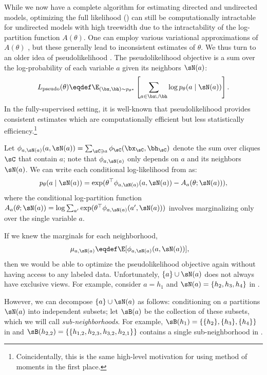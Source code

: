 While we now have a complete algorithm for estimating directed and undirected
models, optimizing the full likelihood ()
can still be computationally intractable for undirected models with high treewidth
due to the intractability of the log-partition function $A(\theta)$.
One can employ various variational approximations of $A(\theta)$ \cite{wainwright08varinf},
but these generally lead to inconsistent estimates of $\theta$.
We thus turn to an older idea of pseudolikelihood \citep{besag75pseudo}.
The pseudolikelihood objective is a sum over the log-probability of each
variable $a$ given its neighbors $\sN(a)$:
\begin{align}
  \label{eqn:pseudolikelihood}
  L_\text{pseudo}(\theta) \eqdef \E_{(\bx,\bh) \sim p_{\theta^*}}\left[\sum_{a \in \bx \cup \bh} \log p_\theta(a \mid \sN(a))\right].
\end{align}
In the fully-supervised setting, it is well-known that pseudolikelihood
provides consistent estimates which are computationally efficient
but less statistically efficiency.\footnote{
Coincidentally, this is the same high-level motivation for using method of
moments in the first place.}

Let $\phi_{a,\sN(a)}(a, \sN(a)) = \sum_{\sC \ni a} \phi_\sC(\bx_\sC,\bh_\sC)$
denote the sum over cliques $\sC$ that contain $a$; note that $\phi_{a, \sN(a)}$ only depends on $a$ and its neighbors $\sN(a)$.
We can write each conditional log-likelihood from  as:
\begin{align*}
p_\theta(a \mid \sN(a)) = \exp(\theta^\top\phi_{a,\sN(a)}(a, \sN(a)) - A_a(\theta; \sN(a))),
\end{align*}
where the conditional log-partition function $A_a(\theta; \sN(a)) = \log \sum_{a'} \exp(\theta^\top\phi_{a,\sN(a)}(a', \sN(a)))$
involves marginalizing only over the single variable $a$.

If we knew the marginals for each neighborhood,
\begin{align}
  \mu_{a,\sN(a)} &\eqdef \E[\phi_{a,\sN(a)}(a,\sN(a))], \label{eqn:neighborhoodFeatures}
\end{align}
then we would be able to optimize the pseudolikelihood objective again without
having access to any labeled data.
Unfortunately, $\{a\}\cup\sN(a)$ does not always have exclusive views.
For example, consider $a = h_1$ and $\sN(a) = \{h_2,h_3,h_4\}$ in .

However, we can decompose $\{a\}\cup\sN(a)$ as follows:
conditioning on $a$ partitions $\sN(a)$ into independent subsets;
let $\sB(a)$ be the collection of these subsets,
which we will call \emph{sub-neighborhoods}.
For example, $\sB(h_1) = \{ \{h_2\},\{h_3\},\{h_4\} \}$ in 
and $\sB(h_{2,2}) = \{ \{ h_{1,2}, h_{2,3}, h_{3,2}, h_{2,1} \} \}$ contains a single sub-neighborhood in .


